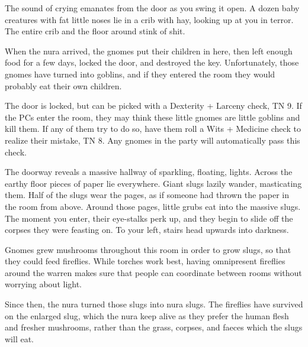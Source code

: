 \begin{multicols}{2}


\begin{boxtext}

	The sound of crying emanates from the door as you swing it open.
	A dozen baby creatures with fat little noses lie in a crib with hay, looking up at you in terror.
	The entire crib and the floor around stink of shit.

\end{boxtext}

\begin{exampletext}

	When the nura arrived, the gnomes put their children in here, then left enough food for a few days, locked the door, and destroyed the key.
	Unfortunately, those gnomes have turned into goblins, and if they entered the room they would probably eat their own children.

\end{exampletext}

The door is locked, but can be picked with a Dexterity + Larceny check, TN 9.
If the PCs enter the room, they may think these little gnomes are little goblins and kill them.
If any of them try to do so, have them roll a Wits + Medicine check to realize their mistake, TN 8.
Any gnomes in the party will automatically pass this check.


\begin{boxtext}

	The doorway reveals a massive hallway of sparkling, floating, lights.
	Across the earthy floor pieces of paper lie everywhere.
	Giant slugs lazily wander, masticating them.
	Half of the slugs wear the pages, as if someone had thrown the paper in the room from above.
	Around those pages, little grubs eat into the massive slugs.
	The moment you enter, their eye-stalks perk up, and they begin to slide off the corpses they were feasting on.
	To your left, stairs head upwards into darkness.

\end{boxtext}

Gnomes grew mushrooms throughout this room in order to grow slugs, so that they could feed fireflies.
While torches work best, having omnipresent fireflies around the warren makes sure that people can coordinate between rooms without worrying about light.

Since then, the nura turned those slugs into nura slugs.
The fireflies have survived on the enlarged slug, which the nura keep alive as they prefer the human flesh and fresher mushrooms, rather than the grass, corpses, and faeces which the slugs will eat.


\end{multicols}
